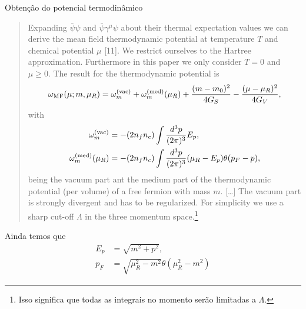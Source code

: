 Obtenção do potencial termodinâmico
\begin{quote}
Expanding $\bar{\psi}\psi$ and $\bar{\psi}\gamma^\mu\psi$ about their thermal expectation values we can derive the mean field thermodynamic potential at temperature $T$ and chemical potential $\mu$ [11]. We restrict ourselves to the Hartree approximation. Furthermore in this paper we only consider $T=0$ and $\mu \geqslant 0$. The result for the thermodynamic potential is
\begin{equation}\label{Eq:Def_pot_termo}
	\omega_{\rm{MF}}(\mu; m, \mu_R) = \omega_m^{\rm{(vac)}} + \omega_m^{\rm{(med)}}(\mu_R) + \frac{(m - m_0)^2}{4G_S} - \frac{(\mu - \mu_R)^2}{4G_V},
\end{equation}
%
with
\begin{align}
	\omega_m^{\rm{(vac)}} &= - (2n_fn_c) \int \frac{d^3p}{(2\pi)^3} E_p, \label{Eq:Def_omega_vac}\\
	\omega_m^{\rm{(med)}}(\mu_R) &= - (2n_fn_c) \int \frac{d^3p}{(2\pi)^3}(\mu_R - E_p)\theta(p_F - p), \label{Eq:Def_omega_med}
\end{align}
%
being the vacuum part ant the medium part of the thermodynamic potential (per volume) of a free fermion with mass $m$. [\dots] The vacuum part is strongly divergent and has to be regularized. For simplicity we use a sharp cut-off $\Lambda$ in the three momentum space.\footnote{Isso significa que todas as integrais no momento serão limitadas a $\Lambda$.}
\end{quote}
%
Ainda temos que
\begin{align}
	E_p &= \sqrt{m^2+p^2}, \label{Eq:Def_E}\\
	p_F &= \sqrt{\mu_R^2 - m^2}\theta(\mu_R^2 - m^2) \label{Eq:Rel_pot_quim_renorm_mom_fermi}
\end{align}

